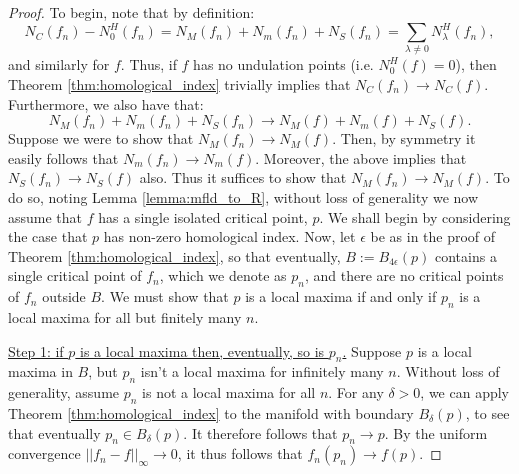\documentclass[11pt]{article}
\newcommand{\1}{\mathbf{1}}
\theoremstyle{definition}
\theoremstyle{remark}
\begin{document}
\begin{proof}
    To begin, note that by definition:
    \begin{equation}\nonumber
        N_C(f_n) - N_0^H(f_n) = N_M(f_n) + N_m(f_n) + N_S(f_n) = \sum_{\lambda \neq 0} N_\lambda^H(f_n),
    \end{equation}
    and similarly for $f$. Thus, if $f$ has no undulation points (i.e. $N_0^H(f)=0$), then Theorem \ref{thm:homological_index} trivially implies that $N_C(f_n)\rightarrow N_C(f)$. Furthermore, we also have that:
    \begin{equation}\nonumber
        N_M(f_n) + N_m(f_n) + N_S(f_n)\rightarrow N_M(f) + N_m(f) + N_S(f).
    \end{equation}
    Suppose we were to show that $N_M(f_n)\rightarrow N_M(f)$. Then, by symmetry it easily follows that $N_m(f_n)\rightarrow N_m(f)$. Moreover, the above implies that $N_S(f_n)\rightarrow N_S(f)$ also. Thus it suffices to show that $N_M(f_n)\rightarrow N_M(f)$. To do so, noting Lemma \ref{lemma:mfld_to_R}, without loss of generality we now assume that $f$ has a single isolated critical point, $p$. We shall begin by considering the case that $p$ has non-zero homological index. Now, let $\epsilon$ be as in the proof of Theorem \ref{thm:homological_index}, so that eventually, $B:=B_{4\epsilon}(p)$ contains a single critical point of $f_n$, which we denote as $p_n$, and there are no critical points of $f_n$ outside $B$. We must show that $p$ is a local maxima if and only if $p_n$ is a local maxima for all but finitely many $n$.
    
    \underline{Step 1: if $p$ is a local maxima then, eventually, so is $p_n$.}  Suppose $p$ is a local maxima in $B$, but $p_n$ isn't a local maxima for infinitely many $n$. Without loss of generality, assume $p_n$ is not a local maxima for all $n$. For any $\delta >0$, we can apply Theorem \ref{thm:homological_index} to the manifold with boundary $B_{\delta}(p)$, to see that eventually $p_n\in B_{\delta}(p)$. It therefore follows that $p_n\rightarrow p$. By the uniform convergence $||f_n-f||_\infty\rightarrow 0$, it thus follows that $f_n(p_n)\rightarrow f(p)$.
    

\end{proof}
\end{document}
